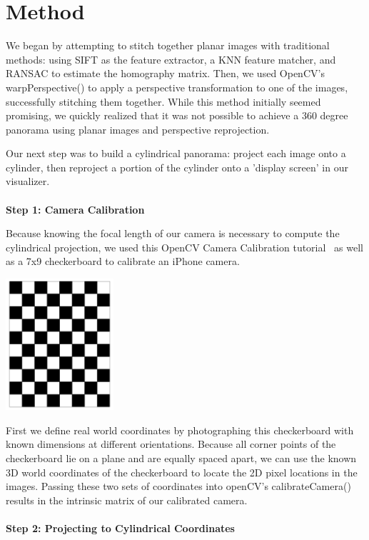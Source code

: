 \documentclass[10pt,twocolumn,letterpaper]{article}
\begin{document}
\section{Method}

We began by attempting to stitch together planar images with traditional methods: using SIFT as the feature extractor, a KNN feature matcher, and RANSAC to estimate the homography matrix. Then, we used OpenCV's warpPerspective() to apply a perspective transformation to one of the images, successfully stitching them together. While this method initially seemed promising, we quickly realized that it was not possible to achieve a 360 degree panorama using planar images and perspective reprojection.

Our next step was to build a cylindrical panorama: project each image onto a cylinder, then reproject a portion of the cylinder onto a 'display screen' in our visualizer.\\\\
\textbf{Step 1: Camera Calibration}

Because knowing the focal length of our camera is necessary to compute the cylindrical projection, we used this OpenCV Camera Calibration tutorial~\cite{sadekar20} as well as a 7x9 checkerboard to calibrate an iPhone camera.

\includegraphics[width=4cm]{checkerboard.png}

First we define real world coordinates by photographing this checkerboard with known dimensions at different orientations. Because all corner points of the checkerboard lie on a plane and are equally spaced apart, we can use the known 3D world coordinates of the checkerboard to locate the 2D pixel locations in the images. Passing these two sets of coordinates into openCV's calibrateCamera() results in the intrinsic matrix of our calibrated camera.\\\\
\textbf{Step 2: Projecting to Cylindrical Coordinates}
\end{document}
